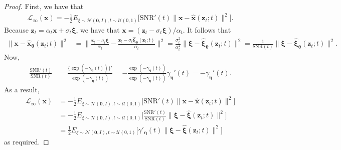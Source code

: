 \documentclass[10pt]{article}
\newcommand{\ve}[1]{\mathbf{#1}}
\newcommand{\ves}[1]{\boldsymbol{#1}}
\newcommand{\mcal}[1]{\mathcal{#1}}
\newcommand{\N}{\mathcal{N}}
\newcommand{\SNR}{\mathrm{SNR}}
\begin{document}
\begin{itemize}
\begin{proof}
  First, we have that
  \begin{align*}
    \mcal{L}_{\infty}(\ve{x}) 
    = -\frac{1}{2} E_{\xi \sim \N(\ve{0},I), t \sim \mcal{U}(0,1)} \big[ \SNR'(t) \| \ve{x} - \hat{\ve{x}}(\ve{z}_t; t) \|^2 \big].
  \end{align*}
  Because $\ve{z}_t = \alpha_t \ve{x} + \sigma_t \ves{\xi}$, we have that $\ve{x} = (\ve{z}_t - \sigma_t \ves{\xi}) / \alpha_t$. It follows that
  \begin{align*}
    \| \ve{x} - \hat{\ve{x}}_{\ves{\theta}}(\ve{z}_t ; t) \|^2
    &= \bigg\| \frac{\ve{z}_t - \sigma_t \ves{\xi}}{\alpha_t} - \frac{\ve{z}_t - \sigma_t \hat{\ves{\xi}}_{\ves{\theta}}(\ve{z}_t; t)}{\alpha_t} \bigg\|^2
    = \frac{\sigma_t^2}{\alpha_t^2} \|\ves{\xi} - \hat{\ves{\xi}}_{\ves{\theta}}(\ve{z}_t; t) \|^2
    = \frac{1}{\SNR(t)} \|\ves{\xi} - \hat{\ves{\xi}}_{\ves{\theta}}(\ve{z}_t; t) \|^2.
  \end{align*}
  Now,
  \begin{align*}
    \frac{\SNR'(t)}{\SNR(t)}
    &= \frac{\{ \exp(-\gamma_{\ves{\eta}}(t)) \}'}{\exp(-\gamma_{\ves{\eta}}(t))}
    = - \frac{ \exp(-\gamma_{\ves{\eta}}(t)) }{\exp(-\gamma_{\ves{\eta}}(t))} \gamma_{\ves{\eta}}'(t)
    = - \gamma_{\ves{\eta}}'(t).
  \end{align*}
  As a result,
  \begin{align*}
    \mcal{L}_{\infty}(\ve{x}) 
    &= -\frac{1}{2} E_{\xi \sim \N(\ve{0},I), t \sim \mcal{U}(0,1)} \big[ \SNR'(t) \| \ve{x} - \hat{\ve{x}}(\ve{z}_t; t) \|^2 \big] \\
    &= -\frac{1}{2} E_{\xi \sim \N(\ve{0},I), t \sim \mcal{U}(0,1)} \bigg[ \frac{\SNR'(t)}{\SNR(t)} \| \ves{\xi} - \hat{\ves{\xi}}(\ve{z}_t; t) \|^2 \bigg] \\
    &= \frac{1}{2} E_{\xi \sim \N(\ve{0},I), t \sim \mcal{U}(0,1)} \big[ \gamma'_{\ves{\eta}}(t) \| \ves{\xi} - \hat{\ves{\xi}}(\ve{z}_t; t) \|^2 \big]
  \end{align*}
  as required.
\end{proof}

\end{itemize}



  
\end{document}
